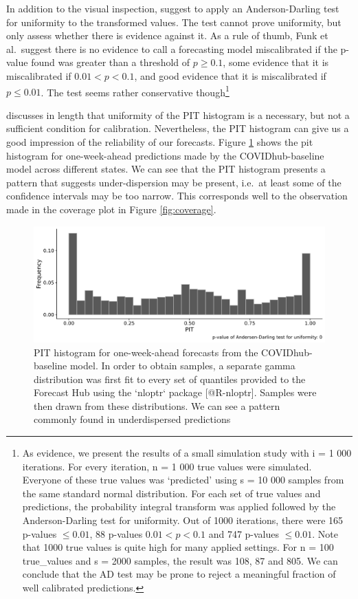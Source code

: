 \documentclass[
]{book}
\begin{document}
In addition to the visual inspection, \citet{funkAssessingPerformanceRealtime2019} suggest to apply an Anderson-Darling \citep{andersonAsymptoticTheoryCertain1952} test for uniformity to the transformed values. The test cannot prove uniformity, but only assess whether there is evidence against it. As a rule of thumb, Funk et al.~suggest there is no evidence to call a forecasting model miscalibrated if the p-value found was greater than a threshold of \(p \geq 0.1\), some evidence that it is miscalibrated if \(0.01 < p < 0.1\), and good evidence that it is miscalibrated if \(p \leq 0.01\). The test seems rather conservative though\footnote{As evidence, we present the results of a small simulation study with i = 1 000 iterations. For every iteration, n = 1 000 true values were simulated. Everyone of these true values was `predicted' using s = 10 000 samples from the same standard normal distribution. For each set of true values and predictions, the probability integral transform was applied followed by the Anderson-Darling test for uniformity. Out of 1000 iterations, there were 165 p-values \(\leq 0.01\), 88 p-values \(0.01 < p < 0.1\) and 747 p-values \(\leq 0.01\). Note that 1000 true values is quite high for many applied settings. For n = 100 true\_values and s = 2000 samples, the result was 108, 87 and 805. We can conclude that the AD test may be prone to reject a meaningful fraction of well calibrated predictions.}

\citet{hamillInterpretationRankHistograms2001} discusses in length that uniformity of the PIT histogram is a necessary, but not a sufficient condition for calibration. Nevertheless, the PIT histogram can give us a good impression of the reliability of our forecasts. Figure \ref{fig:pit-baseline-model} shows the pit histogram for one-week-ahead predictions made by the COVIDhub-baseline model across different states. We can see that the PIT histogram presents a pattern that suggests under-dispersion may be present, i.e.~at least some of the confidence intervals may be too narrow. This corresponds well to the observation made in the coverage plot in Figure \ref{fig:coverage}.

\begin{figure}
\includegraphics[width=1\linewidth]{../visualisation/chapter-3-evaluation/pit-baseline-model} \caption{PIT histogram for one-week-ahead forecasts from the COVIDhub-baseline model. In order to obtain samples, a separate gamma distribution was first fit to every set of quantiles provided to the Forecast Hub using the `nloptr` package [@R-nloptr]. Samples were then drawn from these distributions. We can see a pattern commonly found in underdispersed predictions}\label{fig:pit-baseline-model}
\end{figure}
\end{document}
